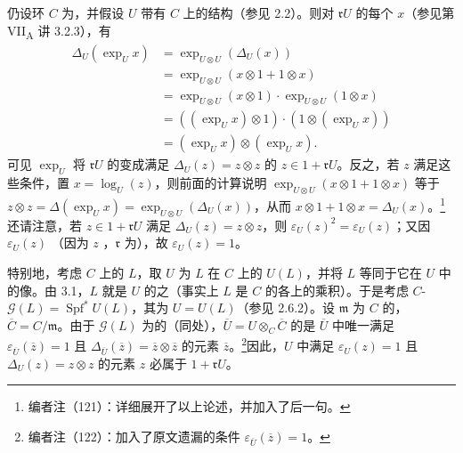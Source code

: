 仍设环 $C$ 为，并假设 $U$ 带有 $C$ 上的结构（参见 2.2）。则对 $\mathfrak rU$ 的每个 $x$（参见第 VII\textsubscript{A} 讲 3.2.3），有
\[
\begin{aligned}
\Delta_U(\exp_Ux)&=\exp_{U\otimes U}(\Delta_U(x))\\
&=\exp_{U\otimes U}(x\otimes1+1\otimes x)\\
&=\exp_{U\otimes U}(x\otimes1)\cdot\exp_{U\otimes U}(1\otimes x)\\
&=((\exp_Ux)\otimes1)\cdot(1\otimes(\exp_Ux))\\
&=(\exp_Ux)\otimes(\exp_Ux).
\end{aligned}
\]
可见 $\exp_U$ 将 $\mathfrak rU$ 的变成满足 $\Delta_U(z)=z\otimes z$ 的 $z\in1+\mathfrak rU$。反之，若 $z$ 满足这些条件，置 $x=\log_U(z)$，则前面的计算说明 $\exp_{U\otimes U}(x\otimes1+1\otimes x)$ 等于 $z\otimes z=\Delta(\exp_Ux)=\exp_{U\otimes U}(\Delta_U(x))$，从而 $x\otimes1+1\otimes x=\Delta_U(x)$。\footnote{编者注（121）：详细展开了以上论述，并加入了后一句。}还请注意，若 $z\in1+\mathfrak rU$ 满足 $\Delta_U(z)=z\otimes z$，则 $\varepsilon_U(z)^2=\varepsilon_U(z)$；又因 $\varepsilon_U(z)$ （因为 $z$ ，$\mathfrak r$ 为），故 $\varepsilon_U(z)=1$。

特别地，考虑 $C$ 上的 $L$，取 $U$ 为 $L$ 在 $C$ 上的 $U(L)$，并将 $L$ 等同于它在 $U$ 中的像。由 3.1，$L$ 就是 $U$ 的之（事实上 $L$ 是 $C$ 的各上的乘积）。于是考虑
$C$- $\mathscr G(L)=\operatorname{Spf}^*U(L)$，其为 $U=U(L)$（参见 2.6.2）。设 $\mathfrak m$ 为 $C$ 的，$\overline C=C/\mathfrak m$。由于 $\mathscr G(L)$ 为的（同处），$\overline U=U\otimes_C\overline C$ 的是 $\overline U$ 中唯一满足 $\varepsilon_{\overline U}(\overline z)=1$ 且 $\Delta_{\overline U}(\overline z)=\overline z\otimes\overline z$ 的元素 $\overline z$。\footnote{编者注（122）：加入了原文遗漏的条件 $\varepsilon_{\overline U}(\overline z)=1$。}因此，$U$ 中满足 $\varepsilon_U(z)=1$ 且 $\Delta_U(z)=z\otimes z$ 的元素 $z$ 必属于 $1+\mathfrak rU$。

